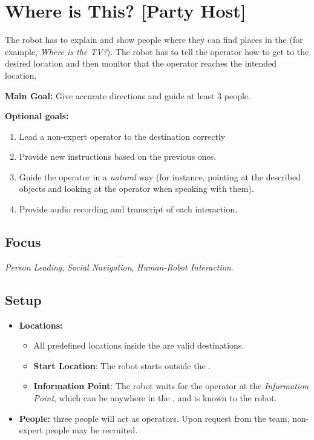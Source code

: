 \section{Where is This? [Party Host]}
\label{test:where-is-this}
The robot has to explain and show people where they can find places in the \Arena{} (for example, \emph{Where is the TV?}). The robot has to tell the operator how to get to the desired location and then monitor that the operator reaches the intended location.

\noindent \textbf{Main Goal:} Give accurate directions and guide at least 3 people.

\noindent \textbf{Optional goals:}
\begin{enumerate}[nosep]
	\item Lead a non-expert operator to the destination correctly
	\item Provide new instructions based on the previous ones.
	\item Guide the operator in a \emph{natural} way (for instance, pointing at the described objects and looking at the operator when speaking with them).
	\item Provide audio recording and transcript of each interaction.
\end{enumerate}

\subsection*{Focus}
\emph{Person Leading}, \emph{Social Navigation}, \emph{Human-Robot Interaction}.


\subsection*{Setup}
\begin{itemize}[nosep]
	\item \textbf{Locations:} 
	\begin{itemize}
	 \item All predefined locations inside the \Arena{} are valid destinations.
	 \item \textbf{Start Location}:  The robot starts outside the \Arena{}. 
	 \item \textbf{Information Point}: The robot waits for the operator at the \emph{Information Point}, which can be anywhere in the \Arena{}, and is known to the robot. 
	\end{itemize}
		\item \textbf{People:} three people will act as operators. Upon request from the team, non-expert people may be recruited.
\end{itemize}


